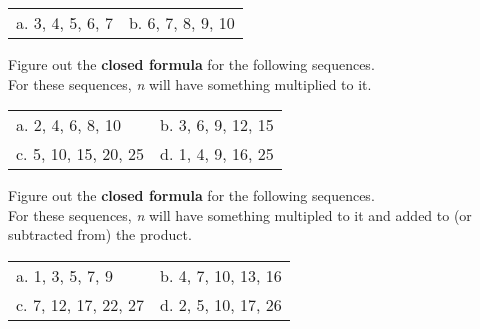 {\begin{questionNOGRADE}{\thequestion}
        \begin{center}
            \begin{tabular}{p{6cm} p{6cm}}
                a. 3, 4, 5, 6, 7 &
                b. 6, 7, 8, 9, 10
            \end{tabular} 
        \end{center} 
    \end{questionNOGRADE}

    \hrulefill

    \begin{questionNOGRADE}{\thequestion}
        Figure out the \textbf{closed formula} for the following sequences. \\
        For these sequences, \textit{n} will have something multiplied to it.

        \begin{center}
            \begin{tabular}{p{6cm} p{6cm}}
                a. 2, 4, 6, 8, 10 &
                b. 3, 6, 9, 12, 15 \\
                c. 5, 10, 15, 20, 25 &
                d. 1, 4, 9, 16, 25
            \end{tabular}   
        \end{center}    
    \end{questionNOGRADE}

    \hrulefill

    \begin{questionNOGRADE}{\thequestion}
        Figure out the \textbf{closed formula} for the following sequences. \\
        For these sequences, \textit{n} will have something multipled to it
        and added to (or subtracted from) the product.

        \begin{center}
            \begin{tabular}{p{6cm} p{6cm}}
                a. 1, 3, 5, 7, 9 &
                b. 4, 7, 10, 13, 16 \\
                c. 7, 12, 17, 22, 27 &
                d. 2, 5, 10, 17, 26
            \end{tabular}
        \end{center}
    \end{questionNOGRADE}

    \newpage


}
